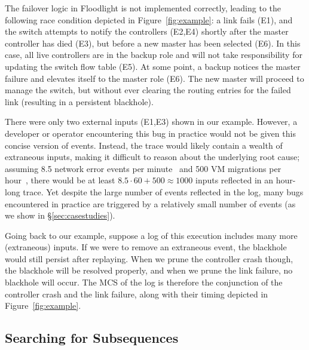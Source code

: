 The failover logic in Floodlight is not implemented correctly, leading to the
following race condition depicted in
Figure~\ref{fig:example}:
a link fails (E1), and the switch attempts to notify the controllers (E2,E4) shortly after the master
controller has died (E3), but before a new master has been selected (E6). In this case, all live controllers are in
the backup role and will not take responsibility for updating the switch
flow table (E5). At some point, a backup notices the master failure and
elevates itself to the master role (E6). The new master will proceed to manage
the switch, but without ever clearing the routing entries for
the failed link (resulting in a persistent blackhole).

There were only two external inputs (E1,E3) shown in our example.
However, a developer or operator encountering this bug in practice would not be
given this concise version of events. Instead, the trace would likely contain a wealth
of extraneous inputs, making it difficult
to reason about the underlying root cause;
assuming 8.5 network error events per
minute~\cite{Greenberg:2009:VSF:1592568.1592576} and 500 VM migrations per
hour~\cite{Soundararajan:2010:CBS:1899928.1899941},
there would be at least $8.5 \cdot 60 + 500 \approx 1000$ inputs reflected in
an hour-long trace. Yet despite the large number of events reflected in the
log, many bugs encountered in practice are triggered by a
relatively small number of events (as we show in \S\ref{sec:casestudies}).

Going back to our example,
suppose a log of this execution includes many more (extraneous) inputs. If we
were to remove an
extraneous event, the blackhole would still persist after replaying.
When we prune the controller crash though, the blackhole will be resolved properly, and
when we prune the link failure, no blackhole will occur. The MCS
of the log is therefore the conjunction of the controller crash and the link
failure, along with their timing depicted in Figure~\ref{fig:example}.

\subsection{Searching for Subsequences}
\label{subsec:algorithm}

